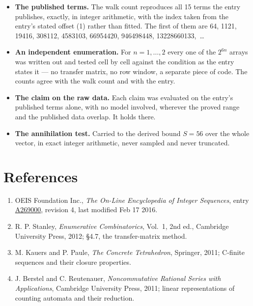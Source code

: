 \documentclass[11pt]{article}
\theoremstyle{definition}
\begin{document}
\begin{itemize}

\item {\bfseries The published terms.} The walk count reproduces all 15 terms the entry publishes, exactly, in integer arithmetic, with the index taken from the entry's stated offset (1) rather than fitted. The first of them are 64, 1121, 19416, 308112, 4583103, 66954420, 946498448, 13228660133,~\dots

\item {\bfseries An independent enumeration.} For $n = 1,\dots,2$ every one of the $2^{6n}$ arrays was written out and tested cell by cell against the condition as the entry states it --- no transfer matrix, no row window, a separate piece of code. The counts agree with the walk count and with the entry.

\item {\bfseries The claim on the raw data.} Each claim was evaluated on the entry's published terms alone, with no model involved, wherever the proved range and the published data overlap. It holds there.

\item {\bfseries The annihilation test.} Carried to the derived bound $S = 56$ over the whole vector, in exact integer arithmetic, never sampled and never truncated.

\end{itemize}

\section{References}

\begin{enumerate}

\item OEIS Foundation Inc., \emph{The On-Line Encyclopedia of Integer Sequences}, entry \href{https://oeis.org/A269000}{A269000}, revision 4, last modified Feb 17 2016.

\item R. P. Stanley, \emph{Enumerative Combinatorics}, Vol.~1, 2nd ed., Cambridge University Press, 2012; \S4.7, the transfer-matrix method.

\item M. Kauers and P. Paule, \emph{The Concrete Tetrahedron}, Springer, 2011; C-finite sequences and their closure properties.

\item J. Berstel and C. Reutenauer, \emph{Noncommutative Rational Series with Applications}, Cambridge University Press, 2011; linear representations of counting automata and their reduction.

\end{enumerate}
\end{document}
